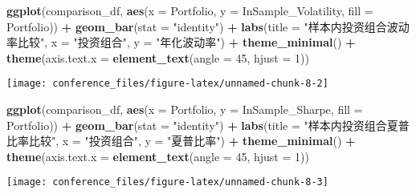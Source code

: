 \documentclass[
]{article}
\newenvironment{Shaded}{\begin{snugshade}}{\end{snugshade}}
\newcommand{\AttributeTok}[1]{\textcolor[rgb]{0.13,0.29,0.53}{#1}}
\newcommand{\DecValTok}[1]{\textcolor[rgb]{0.00,0.00,0.81}{#1}}
\newcommand{\FunctionTok}[1]{\textcolor[rgb]{0.13,0.29,0.53}{\textbf{#1}}}
\newcommand{\NormalTok}[1]{#1}
\newcommand{\SpecialCharTok}[1]{\textcolor[rgb]{0.81,0.36,0.00}{\textbf{#1}}}
\newcommand{\StringTok}[1]{\textcolor[rgb]{0.31,0.60,0.02}{#1}}
\begin{document}
\begin{Shaded}
\begin{Highlighting}[]
\FunctionTok{ggplot}\NormalTok{(comparison\_df, }\FunctionTok{aes}\NormalTok{(}\AttributeTok{x =}\NormalTok{ Portfolio, }\AttributeTok{y =}\NormalTok{ InSample\_Volatility, }\AttributeTok{fill =}\NormalTok{ Portfolio)) }\SpecialCharTok{+}
  \FunctionTok{geom\_bar}\NormalTok{(}\AttributeTok{stat =} \StringTok{"identity"}\NormalTok{) }\SpecialCharTok{+}
  \FunctionTok{labs}\NormalTok{(}\AttributeTok{title =} \StringTok{"样本内投资组合波动率比较"}\NormalTok{,}
       \AttributeTok{x =} \StringTok{"投资组合"}\NormalTok{,}
       \AttributeTok{y =} \StringTok{"年化波动率"}\NormalTok{) }\SpecialCharTok{+}
  \FunctionTok{theme\_minimal}\NormalTok{() }\SpecialCharTok{+}
  \FunctionTok{theme}\NormalTok{(}\AttributeTok{axis.text.x =} \FunctionTok{element\_text}\NormalTok{(}\AttributeTok{angle =} \DecValTok{45}\NormalTok{, }\AttributeTok{hjust =} \DecValTok{1}\NormalTok{))}
\end{Highlighting}
\end{Shaded}

\begin{center}\texttt{[image: conference\_files/figure-latex/unnamed-chunk-8-2]} \end{center}

\begin{Shaded}
\begin{Highlighting}[]
\FunctionTok{ggplot}\NormalTok{(comparison\_df, }\FunctionTok{aes}\NormalTok{(}\AttributeTok{x =}\NormalTok{ Portfolio, }\AttributeTok{y =}\NormalTok{ InSample\_Sharpe, }\AttributeTok{fill =}\NormalTok{ Portfolio)) }\SpecialCharTok{+}
  \FunctionTok{geom\_bar}\NormalTok{(}\AttributeTok{stat =} \StringTok{"identity"}\NormalTok{) }\SpecialCharTok{+}
  \FunctionTok{labs}\NormalTok{(}\AttributeTok{title =} \StringTok{"样本内投资组合夏普比率比较"}\NormalTok{,}
       \AttributeTok{x =} \StringTok{"投资组合"}\NormalTok{,}
       \AttributeTok{y =} \StringTok{"夏普比率"}\NormalTok{) }\SpecialCharTok{+}
  \FunctionTok{theme\_minimal}\NormalTok{() }\SpecialCharTok{+}
  \FunctionTok{theme}\NormalTok{(}\AttributeTok{axis.text.x =} \FunctionTok{element\_text}\NormalTok{(}\AttributeTok{angle =} \DecValTok{45}\NormalTok{, }\AttributeTok{hjust =} \DecValTok{1}\NormalTok{))}
\end{Highlighting}
\end{Shaded}

\begin{center}\texttt{[image: conference\_files/figure-latex/unnamed-chunk-8-3]} \end{center}
\end{document}
